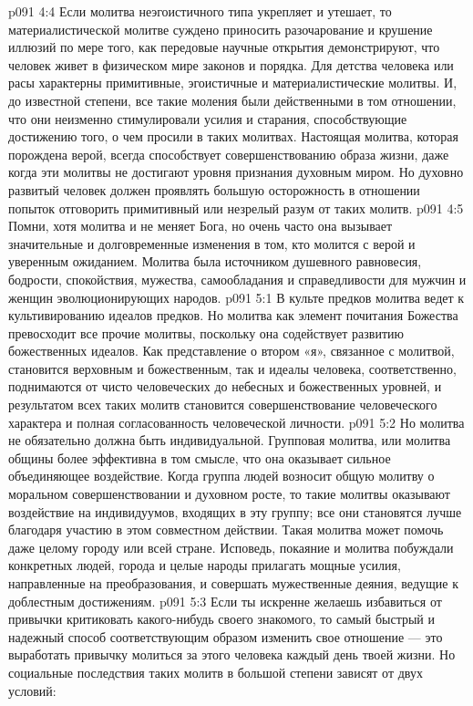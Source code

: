 \vs p091 4:4 Если молитва неэгоистичного типа укрепляет и утешает, то материалистической молитве суждено приносить разочарование и крушение иллюзий по мере того, как передовые научные открытия демонстрируют, что человек живет в физическом мире законов и порядка. Для детства человека или расы характерны примитивные, эгоистичные и материалистические молитвы. И, до известной степени, все такие моления были действенными в том отношении, что они неизменно стимулировали усилия и старания, способствующие достижению того, о чем просили в таких молитвах. Настоящая молитва, которая порождена верой, всегда способствует совершенствованию образа жизни, даже когда эти молитвы не достигают уровня признания духовным миром. Но духовно развитый человек должен проявлять большую осторожность в отношении попыток отговорить примитивный или незрелый разум от таких молитв.
\vs p091 4:5 \pc Помни, хотя молитва и не меняет Бога, но очень часто она вызывает значительные и долговременные изменения в том, кто молится с верой и уверенным ожиданием. Молитва была источником душевного равновесия, бодрости, спокойствия, мужества, самообладания и справедливости для мужчин и женщин эволюционирующих народов.
\vs p091 5:1 В культе предков молитва ведет к культивированию идеалов предков. Но молитва как элемент почитания Божества превосходит все прочие молитвы, поскольку она содействует развитию божественных идеалов. Как представление о втором «я», связанное с молитвой, становится верховным и божественным, так и идеалы человека, соответственно, поднимаются от чисто человеческих до небесных и божественных уровней, и результатом всех таких молитв становится совершенствование человеческого характера и полная согласованность человеческой личности.
\vs p091 5:2 Но молитва не обязательно должна быть индивидуальной. Групповая молитва, или молитва общины более эффективна в том смысле, что она оказывает сильное объединяющее воздействие. Когда группа людей возносит общую молитву о моральном совершенствовании и духовном росте, то такие молитвы оказывают воздействие на индивидуумов, входящих в эту группу; все они становятся лучше благодаря участию в этом совместном действии. Такая молитва может помочь даже целому городу или всей стране. Исповедь, покаяние и молитва побуждали конкретных людей, города и целые народы прилагать мощные усилия, направленные на преобразования, и совершать мужественные деяния, ведущие к доблестным достижениям.
\vs p091 5:3 \pc Если ты искренне желаешь избавиться от привычки критиковать какого\hyp{}нибудь своего знакомого, то самый быстрый и надежный способ соответствующим образом изменить свое отношение --- это выработать привычку молиться за этого человека каждый день твоей жизни. Но социальные последствия таких молитв в большой степени зависят от двух условий:
